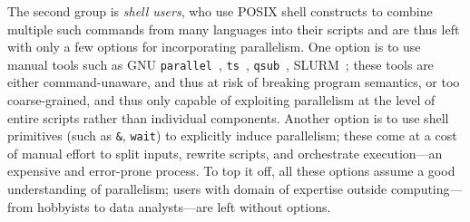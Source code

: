 \documentclass[sigplan, review, screen, anonymous]{acmart}
\newcommand{\ttt}[1]{\texttt{#1}}
\newcommand{\nv}[1]{[{\color{cyan}nv: #1}]}
\newcommand{\kk}[1]{[{\color{magenta}kk: #1}]}
\newcommand{\unix}{{\scshape Unix}\xspace}
\begin{document}
The second group is \emph{shell users}, who use POSIX shell constructs to combine multiple such commands from many languages into their scripts and are thus left with only a few options for incorporating parallelism.
One option is to use manual tools such as GNU \ttt{parallel}~\cite{Tange2011a}, \ttt{ts}~\cite{tsp}, \ttt{qsub}~\cite{gentzsch2001sun}, \textsc{SLURM}~\cite{yoo2003slurm};
  these tools are either command-unaware, and thus at risk of breaking program semantics, or too coarse-grained, and thus only capable of exploiting parallelism at the level of entire scripts rather than individual components.
Another option is to use shell primitives (such as \ttt{&}, \ttt{wait}) to explicitly induce parallelism;
 these come at a cost of manual effort to split inputs, rewrite scripts, and orchestrate execution---an expensive and error-prone process.
To top it off, all these options assume a good understanding of parallelism;
  users with domain of expertise outside computing---from hobbyists to data analysts---are left without options.
\end{document}
